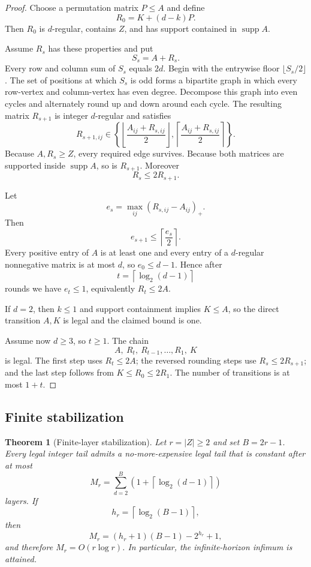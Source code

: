 \documentclass[11pt]{article}
\newtheorem{theorem}{Theorem}[section]
\theoremstyle{definition}
\newcommand{\supp}{\operatorname{supp}}
\begin{document}
\begin{proof}
Choose a permutation matrix $P\le A$ and define
\[
R_0=K+(d-k)P.
\]
Then $R_0$ is $d$-regular, contains $Z$, and has support contained in $\supp A$.

Assume $R_s$ has these properties and put
\[
S_s=A+R_s.
\]
Every row and column sum of $S_s$ equals $2d$.
Begin with the entrywise floor $\lfloor S_s/2\rfloor$.
The set of positions at which $S_s$ is odd forms a bipartite graph in which every row-vertex and
column-vertex has even degree.  Decompose this graph into even cycles and alternately round up and
down around each cycle.  The resulting matrix $R_{s+1}$ is integer $d$-regular and satisfies
\[
R_{s+1,ij}
\in
\left\{
\left\lfloor\frac{A_{ij}+R_{s,ij}}2\right\rfloor,
\left\lceil\frac{A_{ij}+R_{s,ij}}2\right\rceil
\right\}.
\]
Because $A,R_s\ge Z$, every required edge survives.  Because both matrices are supported inside
$\supp A$, so is $R_{s+1}$.  Moreover
\[
R_s\le2R_{s+1}.
\]

Let
\[
e_s=\max_{ij}(R_{s,ij}-A_{ij})_+.
\]
Then
\[
e_{s+1}\le\left\lceil\frac{e_s}{2}\right\rceil.
\]
Every positive entry of $A$ is at least one and every entry of a $d$-regular nonnegative matrix is
at most $d$, so $e_0\le d-1$.  Hence after
\[
t=\left\lceil\log_2(d-1)\right\rceil
\]
rounds we have $e_t\le1$, equivalently $R_t\le2A$.

If $d=2$, then $k\le1$ and support containment implies $K\le A$, so the direct transition
$A,K$ is legal and the claimed bound is one.

Assume now $d\ge3$, so $t\ge1$.  The chain
\[
A,\ R_t,\ R_{t-1},\ldots,R_1,\ K
\]
is legal.  The first step uses $R_t\le2A$; the reversed rounding steps use
$R_s\le2R_{s+1}$; and the last step follows from $K\le R_0\le2R_1$.
The number of transitions is at most $1+t$.
\end{proof}

\subsection{Finite stabilization}

\begin{theorem}[Finite-layer stabilization]
\label{thm:finite}
Let $r=|Z|\ge2$ and set $B=2r-1$.  Every legal integer tail admits a no-more-expensive legal
tail that is constant after at most
\[
M_r
=
\sum_{d=2}^{B}
\left(1+\left\lceil\log_2(d-1)\right\rceil\right)
\]
layers.
If
\[
h_r=\left\lceil\log_2(B-1)\right\rceil,
\]
then
\[
M_r=(h_r+1)(B-1)-2^{h_r}+1,
\]
and therefore $M_r=O(r\log r)$.  In particular, the infinite-horizon infimum is attained.
\end{theorem}
\end{document}
